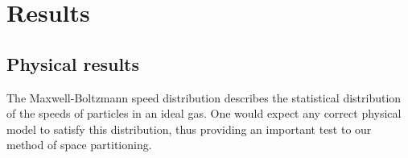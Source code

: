 \section{Results}
\subsection{Physical results}

The Maxwell-Boltzmann speed distribution describes the statistical distribution 
of the speeds of particles in an ideal gas. One would expect any correct 
physical model to satisfy this distribution, thus providing an important test 
to our method of space partitioning.


